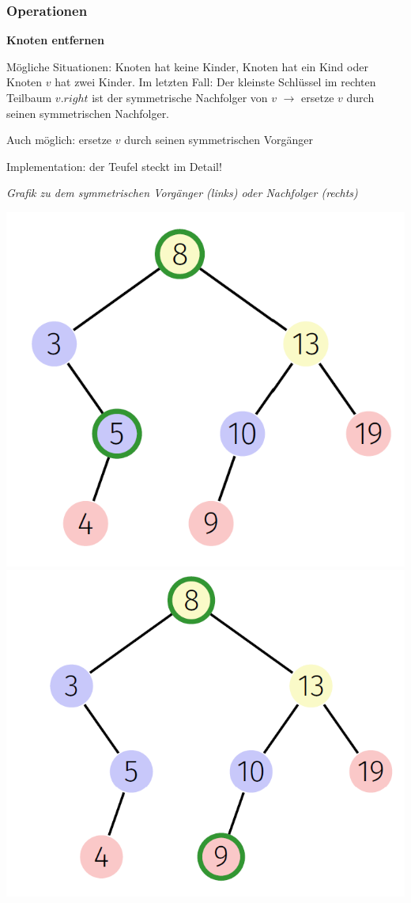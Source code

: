   \vspace{-4pt}
  \begin{sectionbox}
  \subsubsection{Operationen}\smallskip
  
  \textbf{Knoten entfernen}\par
  Mögliche Situationen: Knoten hat keine Kinder, Knoten hat ein Kind oder Knoten $v$ hat zwei Kinder.
  Im letzten Fall: Der kleinste Schlüssel im rechten Teilbaum $v.right$ ist der symmetrische Nachfolger von $v$ $\rightarrow$ ersetze $v$ durch seinen symmetrischen Nachfolger.
  \par Auch möglich: ersetze $v$ durch seinen symmetrischen Vorgänger
  \par Implementation: der Teufel steckt im Detail!
  \end{sectionbox}
  \vspace{-4pt}
  \begin{sectionbox}
  \textit{Grafik zu dem symmetrischen Vorgänger (links) oder Nachfolger (rechts)}\par
  \begin{center}
  \includegraphics[width = 0.4\columnwidth]{../img/symVorg.png}
  \tab \includegraphics[width = 0.4\columnwidth]{../img/symNachf.png}    
  \end{center}
  \end{sectionbox}
  \vspace{-4pt}
